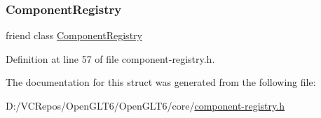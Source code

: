 \subsubsection{\texorpdfstring{ComponentRegistry}{ComponentRegistry}}
{\footnotesize\ttfamily friend class \mbox{\hyperlink{classnabla_1_1_component_registry}{Component\+Registry}}\hspace{0.3cm}{\ttfamily [friend]}}



Definition at line 57 of file component-\/registry.\+h.



The documentation for this struct was generated from the following file\+:\begin{DoxyCompactItemize}
\item 
D\+:/\+V\+C\+Repos/\+Open\+G\+L\+T6/\+Open\+G\+L\+T6/core/\mbox{\hyperlink{component-registry_8h}{component-\/registry.\+h}}\end{DoxyCompactItemize}
